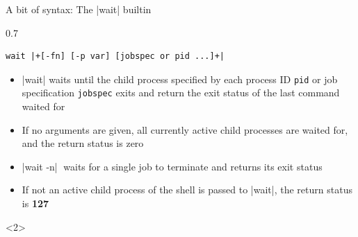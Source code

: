 \begin{frame}[fragile]{A bit of syntax: The \bash|wait| builtin}
    \begin{overlayarea}{\textwidth}{0.7\textheight}
        \begin{lstlisting}[style=MyBash, numbers=none, belowskip=-6mm]
            wait |+[-fn] [-p var] [jobspec or pid ...]+|
        \end{lstlisting}
        \begin{itemize}
            \item \alert<3>{\bash|wait| waits until the child process specified by each process ID \texttt{pid} or job specification \texttt{jobspec} exits and return the exit status of the last command waited for}
            \item \alert<2>{If no arguments are given, all currently active child processes are waited for, and the return status is zero}
            \item \alert<4>{\bash|wait -n|$\;$ waits for a single job to terminate and returns its exit status}
            \item \alert<5>{If not an active child process of the shell is passed to \bash|wait|, the return status is \textbf{127}}
        \end{itemize}
        \vspace{-2mm}
        \begin{onlyenv}<2>

\end{onlyenv}
\end{overlayarea}
\end{frame}
